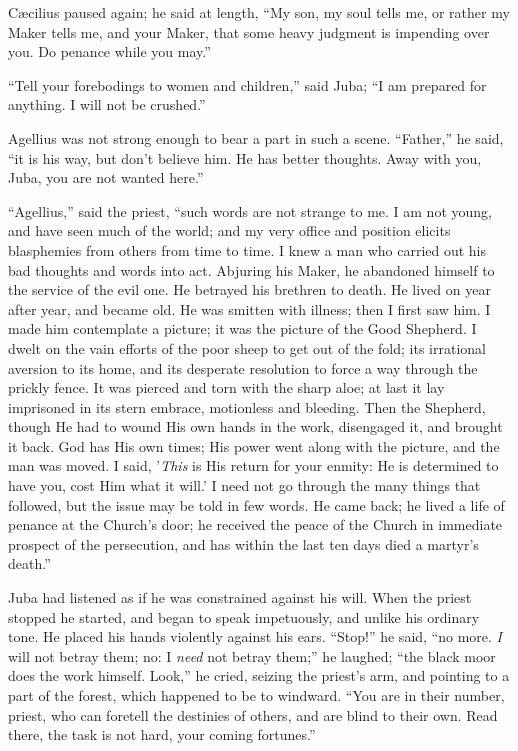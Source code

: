 Cæcilius paused again; he said at length, ``My son, my soul
tells me, or rather my Maker tells me, and your Maker, that some heavy
judgment is impending over you. Do penance while you may.''

``Tell your forebodings to women and children,'' said
Juba; ``I am prepared for anything. I will not be crushed.''

Agellius was not strong enough to bear a part in such a scene.
``Father,'' he said, ``it is his way, but don't believe
him. He has better thoughts. Away with you, Juba, you are not wanted
here.''

``Agellius,'' said the priest, ``such words are not
strange to me. I am not young, and have seen much of the world; and my
very office and position elicits blasphemies from others from time to
time. I knew a man who carried out his bad thoughts and words into
act. Abjuring his Maker, he abandoned himself to the service of the
evil one. He betrayed his brethren to death. He lived on year after
year, and became old. He was smitten with illness; then I first saw
him. I made him contemplate a picture; it was the picture of the
Good Shepherd. I dwelt on the vain efforts of the poor sheep to get
out of the fold; its irrational aversion to its home, and its
desperate resolution to force a way through the prickly fence. It was
pierced and torn with the sharp aloe; at last it lay imprisoned in its
stern embrace, motionless and bleeding. Then the Shepherd, though He
had to wound His own hands in the work, disengaged it, and brought it
back. God has His own times; His power went along with the picture,
and the man was moved. I said, '\emph{This} is His return for your
enmity: He is determined to have you, cost Him what it will.' I need
not go through the many things that followed, but the issue may be
told in few words. He came back; he lived a life of penance at the
Church's door; he received the peace of the Church in immediate
prospect of the persecution, and has within the last ten days died a
martyr's death.''

Juba had listened as if he was constrained against his will. When
the priest stopped he started, and began to speak impetuously, and
unlike his ordinary tone. He placed his hands violently against his
ears. ``Stop!'' he said, ``no more. \emph{I} will not
betray them; no: I \emph{need} not betray them;'' he laughed;
``the black moor does the work himself. Look,'' he cried,
seizing the priest's arm, and pointing to a part of the forest, which
happened to be to windward. ``You are in their number, priest, who
can foretell the destinies of others, and are blind to their own. Read
there, the task is not hard, your coming fortunes.''


